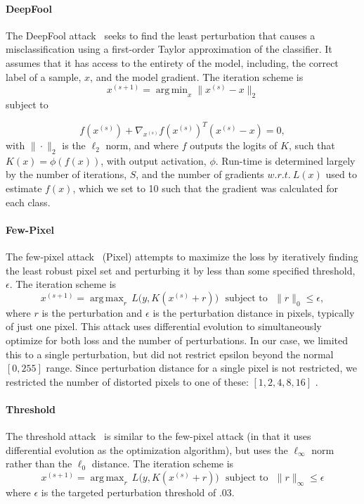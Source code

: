 \documentclass[lettersize,journal]{IEEEtran}
\DeclareMathOperator*{\argmin}{arg\,min}
\DeclareMathOperator*{\argmax}{arg\,max}
\begin{document}
\paragraph{DeepFool}

The DeepFool attack~\cite{deepfool} seeks to find the least perturbation that causes a misclassification using a first-order Taylor approximation of the classifier. It assumes that it has access to the entirety of the model, including, the correct label of a sample, $x$, and the model gradient. The iteration scheme is
$$
    x^{(s+1)} = \argmin_x \|x^{(s)} - x\|_2
$$
subject to

$$
f(x^{(s)}) + \nabla_{x^{(s)}} f(x^{(s)})^T(x^{(s)} - x) = 0,
$$
with $\|\cdot\|_2$ is the $\ell_2$ norm, and where $f$ outputs the logits of $K$, such that $K(x) = \phi(f(x))$, with output activation, $\phi$. Run-time is determined largely by the number of iterations, $S$, and the number of gradients $w.r.t.~L(x)$ used to estimate $f(x)$, which we set to 10 such that the gradient was calculated for each class.





\paragraph{Few-Pixel}

The few-pixel attack~\cite{pixelattack} (Pixel) attempts to maximize the loss by iteratively finding the least robust pixel set and perturbing it by less than some specified threshold, $\epsilon$. The iteration scheme is
$$
    x^{(s+1)} = \argmax_r \, L\big(y, K(x^{(s)} + r)\big) \text{~~subject~to~~}  \|r\|_0 \leq \epsilon,
$$
where $r$ is the perturbation and $\epsilon$ is the perturbation distance in pixels, typically of just one pixel. This attack uses differential evolution to simultaneously optimize for both loss and the number of perturbations. In our case, we limited this to a single perturbation, but did not restrict epsilon beyond the normal $[0, 255]$ range. Since perturbation distance for a single pixel is not restricted, we restricted the number of distorted pixels to one of these: $[1,2,4,8, 16]$ .



\paragraph{Threshold}
The threshold attack~\cite{pixelattack} is similar to the few-pixel attack (in that it uses differential evolution as the optimization algorithm), but uses the $\ell_{\infty}$ norm rather than the $\ell_0$ distance. The iteration scheme is
$$
    x^{(s+1)} = \argmax_r \, L\big(y, K(x^{(s)} + r)\big) \text{~~subject~to~~}  \|r\|_{\infty} \leq \epsilon
$$
where $\epsilon$ is the targeted perturbation threshold of .03.
\end{document}
